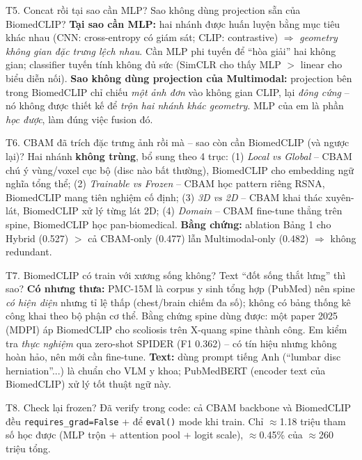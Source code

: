 \documentclass[12pt,a4paper]{article}
\begin{document}
\begin{qabox}{T5. Concat rồi tại sao cần MLP? Sao không dùng projection sẵn của BiomedCLIP?}
\textbf{Tại sao cần MLP:} hai nhánh được huấn luyện bằng mục tiêu khác nhau (CNN: cross-entropy có giám sát; CLIP: contrastive) $\Rightarrow$ \emph{geometry không gian đặc trưng lệch nhau}. Cần MLP phi tuyến để ``hòa giải'' hai không gian; classifier tuyến tính không đủ sức (SimCLR cho thấy MLP $>$ linear cho biểu diễn nối). \textbf{Sao không dùng projection của Multimodal:} projection bên trong BiomedCLIP chỉ chiếu \emph{một ảnh đơn} vào không gian CLIP, lại \emph{đông cứng} -- nó không được thiết kế để \emph{trộn hai nhánh khác geometry}. MLP của em là phần \emph{học được}, làm đúng việc fusion đó.
\end{qabox}

\begin{qabox}{T6. CBAM đã trích đặc trưng ảnh rồi mà -- sao còn cần BiomedCLIP (và ngược lại)?}
Hai nhánh \textbf{không trùng}, bổ sung theo 4 trục: (1) \emph{Local vs Global} -- CBAM chú ý vùng/voxel cục bộ (disc nào bất thường), BiomedCLIP cho embedding ngữ nghĩa tổng thể; (2) \emph{Trainable vs Frozen} -- CBAM học pattern riêng RSNA, BiomedCLIP mang tiên nghiệm cố định; (3) \emph{3D vs 2D} -- CBAM khai thác xuyên-lát, BiomedCLIP xử lý từng lát 2D; (4) \emph{Domain} -- CBAM fine-tune thẳng trên spine, BiomedCLIP học pan-biomedical. \textbf{Bằng chứng:} ablation Bảng 1 cho Hybrid (0.527) $>$ cả CBAM-only (0.477) lẫn Multimodal-only (0.482) $\Rightarrow$ không redundant.
\end{qabox}

\begin{qabox}{T7. BiomedCLIP có train với xương sống không? Text ``đốt sống thắt lưng'' thì sao?}
\textbf{Có nhưng thưa:} PMC-15M là corpus y sinh tổng hợp (PubMed) nên spine \emph{có hiện diện} nhưng tỉ lệ thấp (chest/brain chiếm đa số); không có bảng thống kê công khai theo bộ phận cơ thể. Bằng chứng spine dùng được: một paper 2025 (MDPI) áp BiomedCLIP cho scoliosis trên X-quang spine thành công. Em kiểm tra \emph{thực nghiệm} qua zero-shot SPIDER (F1 0.362) -- có tín hiệu nhưng không hoàn hảo, nên mới cần fine-tune. \textbf{Text:} dùng prompt tiếng Anh (``lumbar disc herniation''...) là chuẩn cho VLM y khoa; PubMedBERT (encoder text của BiomedCLIP) xử lý tốt thuật ngữ này.
\end{qabox}

\begin{qabox}{T8. Check lại frozen?}
Đã verify trong code: cả CBAM backbone và BiomedCLIP đều \texttt{requires\_grad=False} + để \texttt{eval()} mode khi train. Chỉ $\approx$1.18 triệu tham số học được (MLP trộn + attention pool + logit scale), $\approx$0.45\% của $\approx$260 triệu tổng.
\end{qabox}
\end{document}
